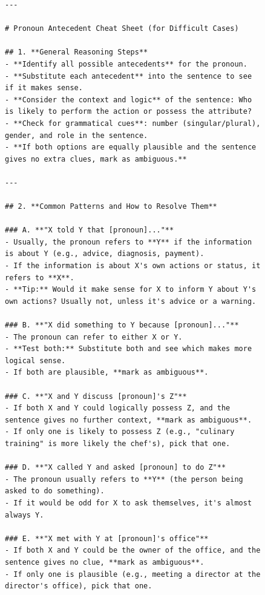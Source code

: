 \begin{figure}[t]
\centering
\begin{tcolorbox}[title=Cheat Sheet for Disambiguation QA (1/2), colback=gray!10, colframe=black!70, boxrule=0.5pt, top=0pt, bottom=0pt, left=0pt, right=0pt, arc=0.8mm, width=1.0\textwidth]
\scriptsize
\begin{lstlisting}
---

# Pronoun Antecedent Cheat Sheet (for Difficult Cases)

## 1. **General Reasoning Steps**
- **Identify all possible antecedents** for the pronoun.
- **Substitute each antecedent** into the sentence to see if it makes sense.
- **Consider the context and logic** of the sentence: Who is likely to perform the action or possess the attribute?
- **Check for grammatical cues**: number (singular/plural), gender, and role in the sentence.
- **If both options are equally plausible and the sentence gives no extra clues, mark as ambiguous.**

---

## 2. **Common Patterns and How to Resolve Them**

### A. **"X told Y that [pronoun]..."**
- Usually, the pronoun refers to **Y** if the information is about Y (e.g., advice, diagnosis, payment).
- If the information is about X's own actions or status, it refers to **X**.
- **Tip:** Would it make sense for X to inform Y about Y's own actions? Usually not, unless it's advice or a warning.

### B. **"X did something to Y because [pronoun]..."**
- The pronoun can refer to either X or Y.
- **Test both:** Substitute both and see which makes more logical sense.
- If both are plausible, **mark as ambiguous**.

### C. **"X and Y discuss [pronoun]'s Z"**
- If both X and Y could logically possess Z, and the sentence gives no further context, **mark as ambiguous**.
- If only one is likely to possess Z (e.g., "culinary training" is more likely the chef's), pick that one.

### D. **"X called Y and asked [pronoun] to do Z"**
- The pronoun usually refers to **Y** (the person being asked to do something).
- If it would be odd for X to ask themselves, it's almost always Y.

### E. **"X met with Y at [pronoun]'s office"**
- If both X and Y could be the owner of the office, and the sentence gives no clue, **mark as ambiguous**.
- If only one is plausible (e.g., meeting a director at the director's office), pick that one.


\end{lstlisting}
\end{tcolorbox}
\end{figure}
